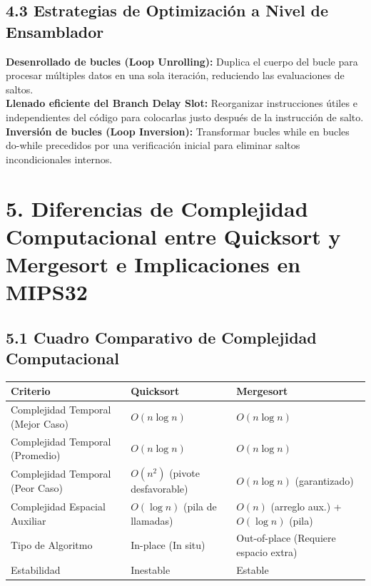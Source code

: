 \documentclass[12pt,a4paper]{article}
\begin{document}
\subsection*{4.3 Estrategias de Optimización a Nivel de Ensamblador}
\textbf{Desenrollado de bucles (Loop Unrolling):} Duplica el cuerpo del bucle para procesar múltiples datos en una sola iteración, reduciendo las evaluaciones de saltos.\\
\textbf{Llenado eficiente del Branch Delay Slot:} Reorganizar instrucciones útiles e independientes del código para colocarlas justo después de la instrucción de salto.\\
\textbf{Inversión de bucles (Loop Inversion):} Transformar bucles while en bucles do-while precedidos por una verificación inicial para eliminar saltos incondicionales internos.

\section*{5. Diferencias de Complejidad Computacional entre Quicksort y Mergesort e Implicaciones en MIPS32}

\subsection*{5.1 Cuadro Comparativo de Complejidad Computacional}
\begin{table}[h!]
\centering
\begin{tabular}{|p{4.5cm}|p{5cm}|p{5cm}|}
\hline
\textbf{Criterio} & \textbf{Quicksort} & \textbf{Mergesort} \\ \hline
Complejidad Temporal (Mejor Caso) & $O(n \log n)$ & $O(n \log n)$ \\ \hline
Complejidad Temporal (Promedio) & $O(n \log n)$ & $O(n \log n)$ \\ \hline
Complejidad Temporal (Peor Caso) & $O(n^2)$ (pivote desfavorable) & $O(n \log n)$ (garantizado) \\ \hline
Complejidad Espacial Auxiliar & $O(\log n)$ (pila de llamadas) & $O(n)$ (arreglo aux.) + $O(\log n)$ (pila) \\ \hline
Tipo de Algoritmo & In-place (In situ) & Out-of-place (Requiere espacio extra) \\ \hline
Estabilidad & Inestable & Estable \\ \hline
\end{tabular}
\end{table}
\end{document}
